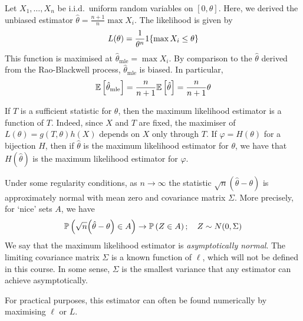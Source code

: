\begin{example}
	Let \( X_1, \dots, X_n \) be i.i.d.\ uniform random variables on \( [0,\theta] \).
	Here, we derived the unbiased estimator \( \hat \theta = \frac{n+1}{n} \max X_i \).
	The likelihood is given by
	\[
		L(\theta) = \frac{1}{\theta^n} 1\qty{\max X_i \leq \theta}
	\]
	This function is maximised at \( \hat \theta_{\mathrm{mle}} = \max X_i \).
	By comparison to the \( \hat \theta \) derived from the Rao-Blackwell process, \( \hat \theta_{\mathrm{mle}} \) is biased.
	In particular,
	\[
		\mathbb{E}\left[{\hat \theta_{\mathrm{mle}}}\right] = \frac{n}{n+1} \mathbb{E}\left[{\hat \theta}\right] = \frac{n}{n+1} \theta
	\]
\end{example}
\begin{remark}
	If \( T \) is a sufficient statistic for \( \theta \), then the maximum likelihood estimator is a function of \( T \).
	Indeed, since \( X \) and \( T \) are fixed, the maximiser of \( L(\theta) = g(T,\theta) h(X) \) depends on \( X \) only through \( T \).
	If \( \varphi = H(\theta) \) for a bijection \( H \), then if \( \hat \theta \) is the maximum likelihood estimator for \( \theta \), we have that \( H(\hat \theta) \) is the maximum likelihood estimator for \( \varphi \).

	Under some regularity conditions, as \( n \to \infty \) the statistic \( \sqrt{n} (\hat \theta - \theta) \) is approximately normal with mean zero and covariance matrix \( \Sigma \).
	More precisely, for `nice' sets \( A \), we have
	\[
		\mathbb{P}\left({\sqrt{n} \qty(\hat \theta - \theta) \in A}\right) \to \mathbb{P}\left({Z \in A}\right);\quad Z \sim N(0, \Sigma)
	\]
	We say that the maximum likelihood estimator is \textit{asymptotically normal}.
	The limiting covariance matrix \( \Sigma \) is a known function of \( \ell \), which will not be defined in this course.
	In some sense, \( \Sigma \) is the smallest variance that any estimator can achieve asymptotically.

	For practical purposes, this estimator can often be found numerically by maximising \( \ell \) or \( L \).
\end{remark}
